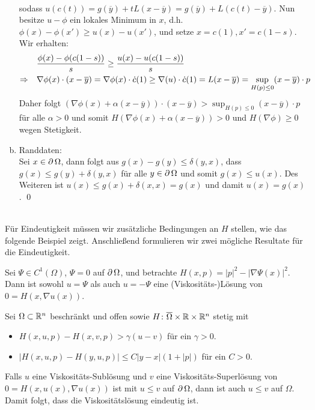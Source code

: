 \begin{enumerate}[a)]
\begin{equation}
\begin{aligned}
		\end{aligned}
		\end{equation}
		sodass $u(c(t)) = g(\overline{y}) + tL(x-\overline{y}) = g(\overline{y}) + L(c(t)-\overline{y})$. Nun besitze $u-\phi$ ein lokales Minimum in $x$, d.h. $\phi(x) - \phi(x') \geq u(x) - u(x')$, und setze $x=c(1), x'=c(1-s)$. Wir erhalten:
		\begin{equation}
		\begin{aligned}
			&\frac{\phi(x)-\phi(c(1-s))}{s} \geq \frac{u(x) - u(c(1-s))}{s} \\ \notag
			\Rightarrow \quad &\nabla \phi(x) \cdot (x-\overline{y}) = \nabla \phi(x) \cdot \dot{c}(1) \geq \nabla(u) \cdot \dot{c}(1) = L(x-\overline{y}) = \sup_{H(p) \leq 0} (x-\overline{y}) \cdot p
		\end{aligned}
		\end{equation}
		Daher folgt $(\nabla \phi(x) + \alpha(x-\overline{y})) \cdot (x-\overline{y}) > \sup_{H(p) \leq 0} (x-\overline{y})\cdot p$ für alle $\alpha > 0$ und somit $H(\nabla \phi(x) + \alpha(x- \overline{y})) > 0$ und $H(\nabla \phi) \geq 0$ wegen Stetigkeit.
		\item Randdaten: \\
		Sei $x \in \operatorname{\partial}\Omega$, dann folgt aus $g(x)-g(y) \leq \delta(y,x)$, dass $g(x) \leq g(y) + \delta(y,x)$ für alle $y \in \operatorname{\partial}\Omega$ und somit $g(x) \leq u(x)$. Des Weiteren ist $u(x) \leq g(x) + \delta(x,x) = g(x)$ und damit $u(x) = g(x)$. \qed
	\end{enumerate}

\mbox{} \\
Für Eindeutigkeit müssen wir zusätzliche Bedingungen an $H$ stellen, wie das folgende Beispiel zeigt. Anschließend formulieren wir zwei mögliche Resultate für die Eindeutigkeit.

\begin{bsp} \label{bsp_33}
	Sei $\Psi \in C^1(\Omega)$, $\Psi = 0$ auf $\operatorname{\partial}\Omega$,\marginnote{[33]} und betrachte $H(x,p) = |p|^2 - |\nabla \Psi(x)|^2$. Dann ist sowohl $u = \Psi$ als auch $u = -\Psi$ eine (Viskositäts-)Lösung von $0 = H(x,\nabla u (x))$.
\end{bsp}
	
\begin{thm} \label{thm_34}
	Sei $\Omega \subset \mathbb{R}^n$ beschränkt \marginnote{[34]} und offen sowie $H\colon \overline{\Omega} \times \mathbb{R} \times \mathbb{R}^n$ stetig mit \begin{itemize}
		\item $H(x,u,p) - H(x,v,p) > \gamma(u-v)$ für ein $\gamma > 0$.
		\item $|H(x,u,p) - H(y,u,p)| \leq C|y-x|(1+|p|)$ für ein $C > 0$.
	\end{itemize}
	Falls $u$ eine Viskositäts-Sublösung und $v$ eine Viskositäts-Superlösung von $0 = H(x,u(x),\nabla u(x))$ ist mit $u \leq v$ auf $\operatorname{\partial} \Omega$, dann ist auch $u \leq v$ auf $\Omega$. Damit folgt, dass die Viskositätslösung eindeutig ist.
\end{thm}
	
